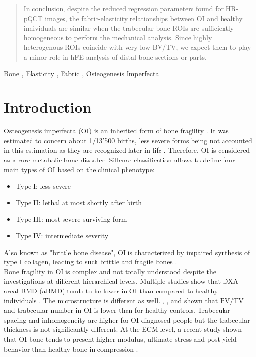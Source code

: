 \documentclass[a4paper,fleqn]{DC_ArtStyle}
\begin{document}
\begin{abstract}
	In conclusion, despite the reduced regression parameters found for HR-pQCT images, the fabric-elasticity relationships between OI and healthy individuals are similar when the trabecular bone ROIs are sufficiently homogeneous to perform the mechanical analysis. Since highly heterogenous ROIs coincide with very low BV/TV, we expect them to play a minor role in hFE analysis of distal bone sections or parts.
\end{abstract}

\begin{keywords}
Bone \sep
Elasticity \sep
Fabric \sep
Osteogenesis Imperfecta
\end{keywords}


\maketitle

\section{Introduction}

Osteogenesis imperfecta (OI) is an inherited form of bone fragility \cite{Tournis2018}. It was estimated to concern about 1/13'500 births, less severe forms being not accounted in this estimation as they are recognized later in life \cite{Lindahl2015}. Therefore, OI is considered as a rare metabolic bone disorder. Sillence classification \cite{Sillence1979} allows to define four main types of OI based on the clinical phenotype:
\begin{itemize}
	\item Type I: less severe
	\item Type II: lethal at most shortly after birth
	\item Type III: most severe surviving form
	\item Type IV: intermediate severity
\end{itemize}
Also known as "brittle bone disease", OI is characterized by impaired synthesis of type I collagen, leading to such brittle and fragile bones \cite{LIM2017}.\\

Bone fragility in OI is complex and not totally understood despite the investigations at different hierarchical levels. Multiple studies show that DXA areal BMD (aBMD) tends to be lower in OI than compared to healthy individuals \cite{Folkestad2012,Lindahl2015,Scheres2018}. The microstructure is different as well. \citeauthor{Folkestad2012}\cite{Folkestad2012}, \citeauthor{Kocijan2015}\cite{Kocijan2015}, and \citeauthor{Rolvien2018}\cite{Rolvien2018} shown that BV/TV and trabecular number in OI is lower than for healthy controls. Trabecular spacing and inhomogeneity are higher for OI diagnosed people but the trabecular thickness is not significantly different. At the ECM level, a recent study shown that OI bone tends to present higher modulus, ultimate stress and post-yield behavior than healthy bone in compression \cite{Indermaur2021}.\\
\end{document}
